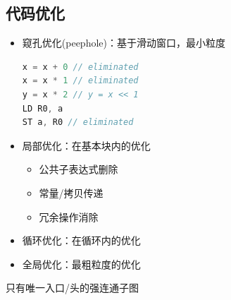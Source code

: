 \subsection{代码优化}
\begin{itemize}
	\item 窥孔优化(peephole)：基于滑动窗口，最小粒度
\begin{lstlisting}[language=c++]
x = x + 0 // eliminated
x = x * 1 // eliminated
y = x * 2 // y = x << 1
LD R0, a
ST a, R0 // eliminated
\end{lstlisting}
	\item 局部优化：在基本块内的优化
\begin{itemize}
	\item 公共子表达式删除
	\item 常量/拷贝传递
	\item 冗余操作消除
\end{itemize}
	\item 循环优化：在循环内的优化
	\item 全局优化：最粗粒度的优化
\end{itemize}

\begin{definition}[循环(loop)]
只有唯一入口/头的强连通子图
\end{definition}

